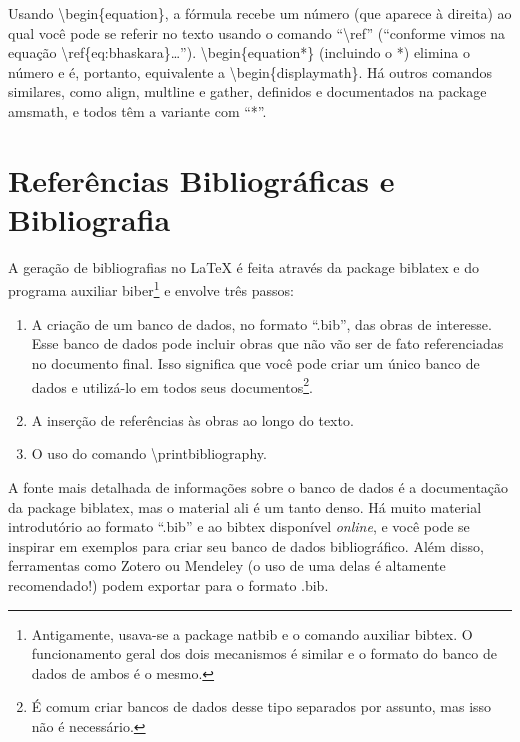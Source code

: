 Usando \textsf{\textbackslash{}begin\{equation\}}, a fórmula recebe um
número (que aparece à direita) ao qual você pode se referir no texto
usando o comando ``\textsf{\textbackslash{}ref}'' (``\textsf{conforme
vimos na equação \textbackslash{}ref\{eq:bhaskara\}\ldots}'').
\textsf{\textbackslash{}begin\{equation*\}} (incluindo o *) elimina
o número e é, portanto, equivalente a
\textsf{\textbackslash{}begin\{displaymath\}}. Há outros comandos
similares, como \textsf{align}, \textsf{multline} e \textsf{gather},
definidos e documentados na package \textsf{amsmath}, e todos têm
a variante com ``*''.

\section{Referências Bibliográficas e Bibliografia}

A geração de bibliografias no \LaTeX{} é feita através da package
biblatex e do programa auxiliar
biber\footnote{Antigamente, usava-se a package
natbib e o comando auxiliar bibtex. O
funcionamento geral dos dois mecanismos é similar e o formato do banco de
dados de ambos é o mesmo.} e envolve três passos:

\begin{enumerate}
\item A criação de um banco de dados, no formato ``.bib'', das obras de
interesse. Esse banco de dados pode incluir obras que não vão ser de fato
referenciadas no documento final. Isso significa que você pode criar um
único banco de dados e utilizá-lo em todos seus documentos\footnote{É
comum criar bancos de dados desse tipo separados por assunto, mas isso
não é necessário.}.

\item A inserção de referências às obras ao longo do texto.

\item O uso do comando \textsf{\textbackslash{}printbibliography}.
\end{enumerate}

A fonte mais detalhada de informações sobre o banco de dados é a
documentação da package biblatex, mas o material ali é um tanto denso.
Há muito material introdutório ao formato ``.bib'' e ao bibtex disponível
\emph{online}, e você pode se inspirar em exemplos para criar seu banco de
dados bibliográfico. Além disso, ferramentas como Zotero ou
Mendeley (o uso de uma delas é altamente recomendado!)
podem exportar para o formato .bib.

